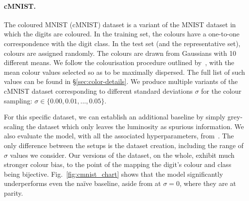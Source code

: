 \paragraph{cMNIST.}
%
The coloured MNIST (cMNIST) dataset is a variant of the MNIST dataset in which the digits are
coloured.
%
In the training set, the colours have a one-to-one correspondence with the digit class.
%
In the test set (and the representative set), colours are assigned randomly.
%
The colours are drawn from Gaussians with 10 different means.
%
We follow the colourisation procedure outlined by~\citet{kim2019learning}, with the mean colour
values selected so as to be maximally dispersed.
%
The full list of such values can be found in \S\ref{sec:color-details}.
%
We produce multiple variants of the cMNIST dataset corresponding to different standard deviations
$\sigma$ for the colour sampling: $\sigma \in \{0.00, 0.01, ..., 0.05 \}$.

For this specific dataset, we can establish an additional baseline by simply grey-scaling the
dataset which only leaves the luminosity as spurious information.
%
We also evaluate the model, with all the associated hyperparameters, from~\citet{kim2019learning}.
%
The only difference between the setups is the dataset creation, including the range of \(\sigma\)
values we consider.
%
Our versions of the dataset, on the whole, exhibit much stronger colour bias, to the point of the
mapping the digit's colour and class being bijective. 
%
Fig.~\ref{fig:cmnist_chart} shows that the model significantly underperforms even the na\"ive
baseline, aside from at \(\sigma = 0\), where they are at parity.
%


